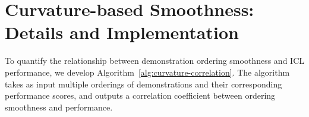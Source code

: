 \documentclass{article}
\theoremstyle{plain}
\theoremstyle{definition}
\theoremstyle{remark}
\begin{document}
\begin{table}[H]
\centering
\small
\setlength{\tabcolsep}{4pt}
\caption{CoT-ICL generated from stronger LLMs versus self-generated demonstrations across five random ordering seeds. Values report $\mu \pm \sigma$.}
\label{tab:stat_stronger_vs_self}
\end{table}

\section{Curvature-based Smoothness: Details and Implementation}
\label{sec:algocurvature}

To quantify the relationship between demonstration ordering smoothness and ICL performance, we develop Algorithm~\ref{alg:curvature-correlation}. The algorithm takes as input multiple orderings of demonstrations and their corresponding performance scores, and outputs a correlation coefficient between ordering smoothness and performance.
\end{document}
